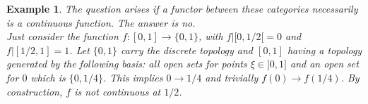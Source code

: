 \documentclass[17pt]{extarticle}
\newtheorem{example}{Example}
\begin{document}
\begin{example}
	The question arises if a functor between these categories necessarily is a continuous function. The answer is no.\\
	 Just consider the function $f:[0,1]\rightarrow \{0,1\}$, with $f|[0,1/2[=0$ and $f|[1/2, 1]=1$. Let $\{0,1\}$ carry the discrete topology and $[0,1]$ having a topology generated by the following basis: all open sets for points $\xi\in ]0,1]$ and an open set for $0$ which is $\{0,1/4\}$. This implies $0\rightarrow 1/4$ and trivially $f(0)\rightarrow f(1/4)$. By construction, $f$ is not continuous at $1/2$.
	
	
\end{example}
\end{document}
